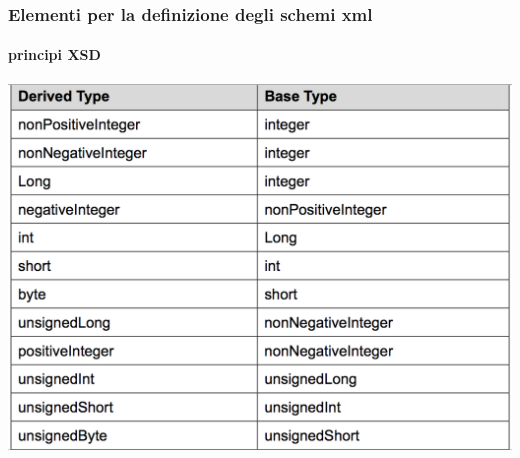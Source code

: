 \begin{frame}
	\frametitle{Elementi per la definizione degli schemi xml}
	\framesubtitle{principi XSD}
	\addtocounter{nframe}{1}

	\begin{center}
		\includegraphics[width=.95\textwidth]{imgs/NumericalDerivedType(12types).png}
	\end{center}

\end{frame}






